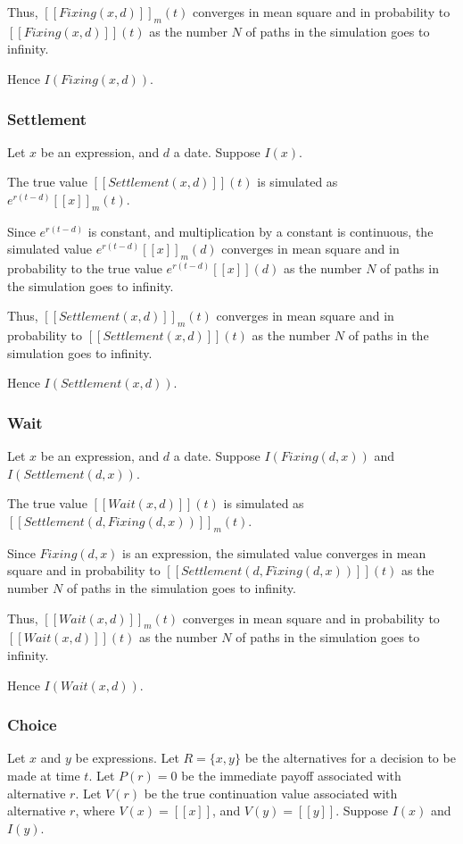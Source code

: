 \documentclass[a4paper,11pt]{article}
\newcommand{\sembrack}[1]{[\![#1]\!]}
\begin{document}
Thus, $\sembrack{Fixing(x, d)}_m(t)$ converges in mean square and in probability to $\sembrack{Fixing(x, d)}(t)$ as the number $N$ of paths in the simulation goes to infinity.

Hence $I(Fixing(x, d))$.

\subsubsection{Settlement}
Let $x$ be an expression, and $d$ a date. Suppose $I(x)$.

The true value $\sembrack{Settlement(x,d)}(t)$ is simulated as $e^{r(t-d)} \sembrack{x}_m(t)$.

Since $e^{r(t-d)}$ is constant, and multiplication by a constant is continuous, the simulated value $e^{r(t-d)} \sembrack{x}_m(d)$ converges in mean square and in probability to the true value $e^{r(t-d)} \sembrack{x}(d)$ as the number $N$ of paths in the simulation goes to infinity.

Thus, $\sembrack{Settlement(x,d)}_m(t)$ converges in mean square and in probability to $\sembrack{Settlement(x,d)}(t)$ as the number $N$ of paths in the simulation goes to infinity.

Hence $I(Settlement(x,d))$.

\subsubsection{Wait}
Let $x$ be an expression, and $d$ a date. Suppose $I(Fixing(d,x))$ and $I(Settlement(d,x))$.

The true value $\sembrack{Wait(x,d)}(t)$ is simulated as $\sembrack{Settlement(d,Fixing(d, x))}_m(t)$.

Since $Fixing(d,x)$ is an expression, the simulated value converges in mean square and in probability to $\sembrack{Settlement(d,Fixing(d, x))}(t)$ as the number $N$ of paths in the simulation goes to infinity.

Thus, $\sembrack{Wait(x,d)}_m(t)$ converges in mean square and in probability to $\sembrack{Wait(x,d)}(t)$ as the number $N$ of paths in the simulation goes to infinity.

Hence $I(Wait(x,d))$.

\subsubsection{Choice}
Let $x$ and $y$ be expressions. Let $R = \{x, y\}$ be the alternatives for a decision to be made at time $t$. Let $P(r) = 0$ be the immediate payoff associated with alternative $r$. Let $V(r)$ be the true continuation value associated with alternative $r$, where $V(x) = \sembrack{x}$, and $V(y) = \sembrack{y}$. Suppose $I(x)$ and $I(y)$.
\end{document}
